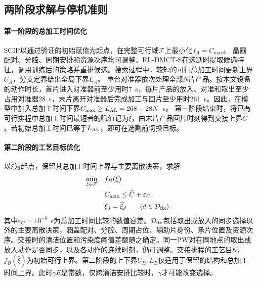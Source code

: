 \documentclass[final,5p,times,twocolumn]{elsarticle}
\begin{document}
\subsection{两阶段求解与停机准则}
\label{sec:two-stage-stop-cn}

\paragraph{第一阶段的总加工时间优化}
SCIP以通过验证的初始赋值为起点，在完整可行域$\mathcal F$上最小化$f_A=C_{\max}$。
晶圆配对、分腔、周期安排和资源次序均可调整。RL-DMCT-S在选割时提取候选特征，调用训练后的策略并重排候选。搜索过程中，较短的可行总加工时间更新上界$U_A$，分支定界给出全局下界$L_A$。
单台对准器依次处理全部$N$片产品。按本文设备的动作时长，首片进入对准器前至少用时7~s，每片产品的放入、对准和取出至少占用对准器28~s，末片离开对准器后完成加工与回片至少用时261~s。因此，在模型中加入总加工时间下界$C_{\max}\ge L_{\rm AL}=268+28N$~s。
第一阶段结束时，将已有可行排程中总加工时间最短者的赋值记为$\widehat\xi$，由末片产品回片时刻得到交接上界$\widehat C$。若初始总加工时间已等于$L_{\rm AL}$，即可在选割前切换目标。

\paragraph{第二阶段的工艺目标优化}
以$\widehat\xi$为起点，保留其总加工时间上界与主要离散决策，求解
\begin{equation}
\begin{aligned}
\min_{\xi\in\mathcal F}\quad & f_B(\xi)\\
\text{}\quad & C_{\max}\le\widehat C+\varepsilon_C,\\
&\xi_d=\widehat\xi_d\qquad(d\in\mathcal D_{\rm fix}).
\end{aligned}
\label{eq:secondary-domain-cn}
\end{equation}
其中$\varepsilon_C=10^{-6}$~s为总加工时间比较的数值容差。$\mathcal D_{\rm fix}$包括取出或放入的同步选择以外的主要离散决策，涵盖配对、分腔、周期占位、辅助片身份、承片位置及资源次序。交接时的清洁位置和污染度阈值差额随之确定。同一PW对在同地点的取出或放入动作是否同步，以及各动作的连续时刻，仍可调整。交接排程的工艺目标$f_B(\widehat\xi)$为初始可行上界。第二阶段的上下界$U_B,L_B$仅适用于保留的结构和总加工时间上界。此时$\gamma E$是常数，仅跨清洁安排比较时，$\gamma$才可能改变选择。
\end{document}
